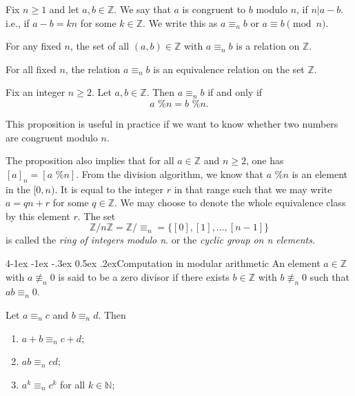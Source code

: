 \documentclass{tufte-handout}
\makeatletter
\renewcommand{\paragraph}{\@startsection{paragraph}%
    {4}{\z@}{-1ex \@plus -1ex \@minus -.3ex}%
    {0.5ex \@plus .2ex}{\normalfont\normalsize\bfseries}}
\makeatother
\begin{document}
\begin{Definition}[Congruence]
    Fix \( n \geq 1 \) and let \( a,b \in \mathbb{Z} \). We say that \( a \) is congruent to \( b \) modulo \( n \),
    if \( n|a-b \). i.e., if \( a-b = kn\)  for some \( k \in \mathbb{Z} \). We write this as \( a \equiv_n b \)
    or \( a \equiv b \pmod{n} \).
\end{Definition}

For any fixed \( n \), the set of all \( (a,b)\in \mathbb{Z} \) with \( a \equiv_n b \)  is a relation on \( \mathbb{Z} \).

\begin{Proposition}
    For all fixed \( n \), the relation \( a \equiv_n b\) is an equivalence relation on the set \( \mathbb{Z} \).
\end{Proposition}

\begin{Proposition}
    Fix an integer \( n \geq 2 \). Let \( a,b\in \mathbb{Z} \). Then \( a \equiv_n b \) if and only if
    \[a \text{ \% } n = b \text{ \% } n.\]
\end{Proposition}

This proposition is useful in practice if we want to know whether two numbers are congruent modulo \( n \).

The proposition also implies that for all \( a \in \mathbb{Z} \) and \( n \geq 2 \),
one has \( [a]_n = [a \text{ \% } n] \). 
From the division algorithm, we know that \( a \text{ \% } n \) is an element in the \( [0,n) \).
It is equal to the integer \( r \) in that range such that we may write \( a = qn + r \) for some \( q \in \mathbb{Z} \).
We may choose to denote the whole equivalence class by this element \( r \). The set
\[ \mathbb{Z}\slash n\mathbb{Z} = \mathbb{Z} \slash \equiv_n = \{[0],[1],\ldots,[n-1]\} \]
is called the \textit{ring of integers modulo n}. or the \textit{cyclic group on n elements}.

\paragraph{Computation in modular arithmetic}
An element \( a\in \mathbb{Z} \) with \( a \not\equiv_n 0 \) is said to be a zero divisor if there exists 
\( b\in \mathbb{Z} \) with \( b \not\equiv_n 0 \) such that \( ab \equiv_n 0 \).

\begin{Proposition}
    Let \( a\equiv_n c  \) and \( b\equiv_n d \). Then
    \begin{enumerate}
        \item \( a+b \equiv_n c+d \);
        \item \( ab \equiv_n cd \);
        \item \( a^k \equiv_n c^k \) for all \( k \in \mathbb{N} \);
    \end{enumerate}
\end{Proposition}
\end{document}
